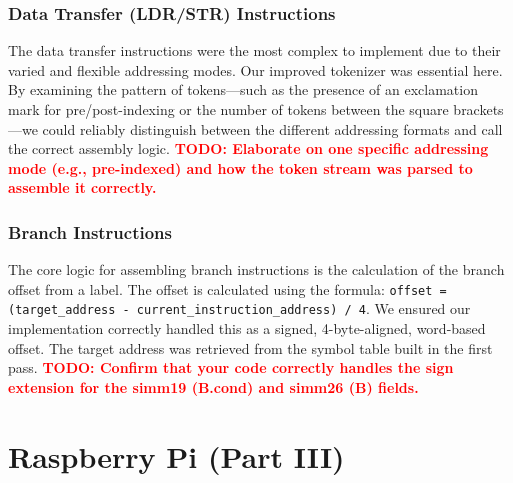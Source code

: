 \documentclass[11pt]{article}
\newcommand{\todo}[1]{\textcolor{red}{\textbf{TODO: #1}}}
\begin{document}
\subsubsection{Data Transfer (LDR/STR) Instructions}
The data transfer instructions were the most complex to implement due to their varied and flexible addressing modes. Our improved tokenizer was essential here. By examining the pattern of tokens---such as the presence of an exclamation mark for pre/post-indexing or the number of tokens between the square brackets---we could reliably distinguish between the different addressing formats and call the correct assembly logic.
\todo{Elaborate on one specific addressing mode (e.g., pre-indexed) and how the token stream was parsed to assemble it correctly.}

\subsubsection{Branch Instructions}
The core logic for assembling branch instructions is the calculation of the branch offset from a label. The offset is calculated using the formula: \texttt{offset = (target\_address - current\_instruction\_address) / 4}. We ensured our implementation correctly handled this as a signed, 4-byte-aligned, word-based offset. The target address was retrieved from the symbol table built in the first pass. 
\todo{Confirm that your code correctly handles the sign extension for the simm19 (B.cond) and simm26 (B) fields.}


\section{Raspberry Pi (Part III)}
\end{document}

